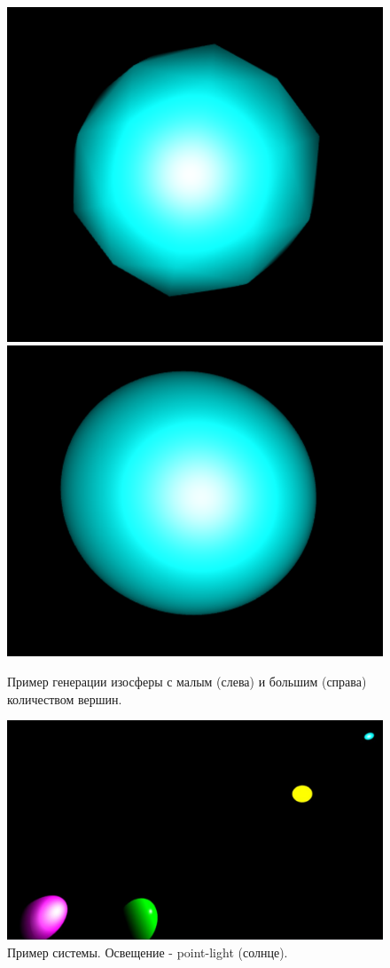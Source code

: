 \documentclass{bmstu}
\begin{document}
	\begin{figure}
		\centering
		\includegraphics[width=0.4\linewidth]{lowres_planet}
		\centering
		\includegraphics[width=0.4\linewidth]{highres_planet}
		\caption{Пример генерации изосферы с малым (слева) и большим (справа) количеством вершин.}
	\end{figure}
	
	\begin{figure}
		\centering
		\includegraphics[width=\linewidth]{sunlight}
		\caption{Пример системы. Освещение - point-light (солнце).}
	\end{figure}
	
\end{document}
